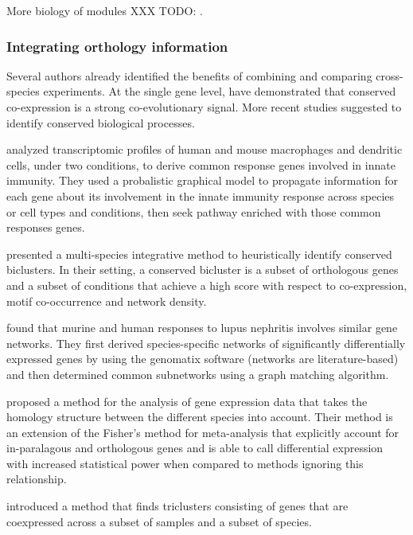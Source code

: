 		More biology of modules XXX TODO: \parencites{dittrich2008identifying}{yamamoto2009better}{backes2012integer}{mitra2013integrative}.

	\subsubsection{Integrating orthology information}

		Several authors already identified the benefits of combining and comparing cross-species experiments.
		At the single gene level, \textcite{noort2003predicting} have demonstrated that conserved co-expression is a strong co-evolutionary signal.
		More recent  studies suggested to identify conserved biological processes.

		\Textcite{lu2009cross} analyzed transcriptomic profiles of human and mouse macrophages and dendritic cells, under two conditions, to derive common response genes involved in innate immunity.
		They used a probalistic graphical model to propagate information for each gene about its involvement in the innate immunity response across species or cell types and conditions, then seek pathway enriched with those common responses genes.

		\Textcite{waltman2010multi} presented a multi-species integrative method to heuristically identify conserved biclusters.
		In their setting, a conserved bicluster is a subset of orthologous genes and a subset of conditions that achieve a high score with respect to co-expression, motif co-occurrence and network density.

		\Textcite{berthier2012cross} found that murine and human responses to lupus nephritis involves similar gene networks.
		They first derived species-specific networks of significantly differentially expressed genes by using the genomatix software (networks are literature-based) and then determined common subnetworks using a graph matching algorithm.

		\Textcite{kristiansson2013novel} proposed a method for the analysis of gene expression data that takes the homology structure between the different species into account.
		Their method is an extension of the Fisher's method for meta-analysis that explicitly account for in-paralagous and orthologous genes and is able to call differential expression with increased statistical power when compared to methods ignoring this relationship.

		\Textcite{dede2014triclust} introduced a method that finds triclusters consisting of genes that are coexpressed across a subset of samples and a subset of species.

